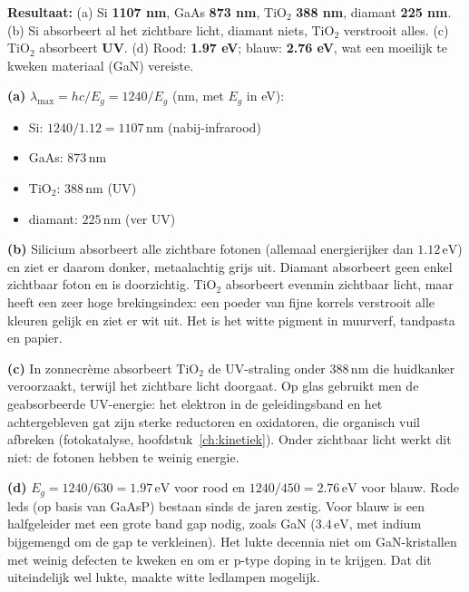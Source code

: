 \begin{oplossing}
\textbf{Resultaat:} (a) Si \textbf{1107 nm}, GaAs \textbf{873 nm}, \(\mathrm{TiO_2}\) \textbf{388 nm}, diamant \textbf{225 nm}. (b) Si absorbeert al het zichtbare licht, diamant niets, \(\mathrm{TiO_2}\) verstrooit alles. (c) \(\mathrm{TiO_2}\) absorbeert \textbf{UV}. (d) Rood: \textbf{1.97 eV}; blauw: \textbf{2.76 eV}, wat een moeilijk te kweken materiaal (GaN) vereiste.

\textbf{(a)} \(\lambda_{\max} = hc/E_g = 1240/E_g\) (nm, met \(E_g\) in eV):

\begin{itemize}
\item
  Si: \(1240/1.12 = 1107\,\mathrm{nm}\) (nabij-infrarood)
\item
  GaAs: \(873\,\mathrm{nm}\)
\item
  \(\mathrm{TiO_2}\): \(388\,\mathrm{nm}\) (UV)
\item
  diamant: \(225\,\mathrm{nm}\) (ver UV)
\end{itemize}

\textbf{(b)} Silicium absorbeert alle zichtbare fotonen (allemaal energierijker dan \(1.12\,\mathrm{eV}\)) en ziet er daarom donker, metaalachtig grijs uit. Diamant absorbeert geen enkel zichtbaar foton en is doorzichtig. \(\mathrm{TiO_2}\) absorbeert evenmin zichtbaar licht, maar heeft een zeer hoge brekingsindex: een poeder van fijne korrels verstrooit alle kleuren gelijk en ziet er wit uit. Het is het witte pigment in muurverf, tandpasta en papier.

\textbf{(c)} In zonnecrème absorbeert \(\mathrm{TiO_2}\) de UV-straling onder \(388\,\mathrm{nm}\) die huidkanker veroorzaakt, terwijl het zichtbare licht doorgaat. Op glas gebruikt men de geabsorbeerde UV-energie: het elektron in de geleidingsband en het achtergebleven gat zijn sterke reductoren en oxidatoren, die organisch vuil afbreken (fotokatalyse, hoofdstuk~\ref{ch:kinetiek}). Onder zichtbaar licht werkt dit niet: de fotonen hebben te weinig energie.

\textbf{(d)} \(E_g = 1240/630 = 1.97\,\mathrm{eV}\) voor rood en \(1240/450 = 2.76\,\mathrm{eV}\) voor blauw. Rode leds (op basis van GaAsP) bestaan sinds de jaren zestig. Voor blauw is een halfgeleider met een grote band gap nodig, zoals GaN (\(3.4\,\mathrm{eV}\), met indium bijgemengd om de gap te verkleinen). Het lukte decennia niet om GaN-kristallen met weinig defecten te kweken en om er p-type doping in te krijgen. Dat dit uiteindelijk wel lukte, maakte witte ledlampen mogelijk.
\end{oplossing}


